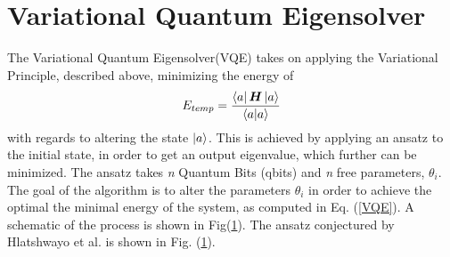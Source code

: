 \section{Variational Quantum Eigensolver}
The Variational Quantum Eigensolver(VQE) takes on applying the Variational Principle, described above, minimizing the energy of 
\begin{equation}\label{VQE}
    E_{temp} = \frac{\bra{a}\boldsymbol{H}\ket{a}}{\braket{a}}
\end{equation}
with regards to altering the state $\ket{a}$. This is achieved by applying an ansatz to the initial state, in order to get an output eigenvalue, which further can be minimized. The ansatz takes \textit{n} Quantum Bits (qbits) and \textit{n} free parameters, $\theta_i$. The goal of the algorithm is to alter the parameters $\theta_i$ in order to achieve the optimal the minimal energy of the system, as computed in Eq. (\ref{VQE}). A schematic of the process is shown in Fig(\ref{}). The ansatz conjectured by Hlatshwayo et al. \cite{} is shown in Fig. (\ref{}). 
